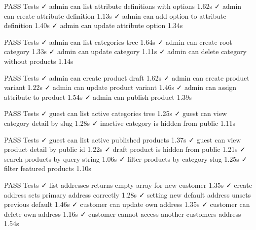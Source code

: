    PASS  Tests\Feature\CatalogAdminAttributeTest
  ✓ admin can list attribute definitions with options                    1.62s  
  ✓ admin can create attribute definition                                1.13s  
  ✓ admin can add option to attribute definition                         1.40s  
  ✓ admin can update attribute option                                    1.34s  

   PASS  Tests\Feature\CatalogAdminCategoryTest
  ✓ admin can list categories tree                                       1.64s  
  ✓ admin can create root category                                       1.33s  
  ✓ admin can update category                                            1.11s  
  ✓ admin can delete category without products                           1.14s  

   PASS  Tests\Feature\CatalogAdminProductTest
  ✓ admin can create product draft                                       1.62s  
  ✓ admin can create product variant                                     1.22s  
  ✓ admin can update product variant                                     1.46s  
  ✓ admin can assign attribute to product                                1.54s  
  ✓ admin can publish product                                            1.39s  

   PASS  Tests\Feature\CatalogPublicCategoryTest
  ✓ guest can list active categories tree                                1.25s  
  ✓ guest can view category detail by slug                               1.28s  
  ✓ inactive category is hidden from public                              1.11s  

   PASS  Tests\Feature\CatalogPublicProductTest
  ✓ guest can list active published products                             1.37s  
  ✓ guest can view product detail by public id                           1.22s  
  ✓ draft product is hidden from public                                  1.21s  
  ✓ search products by query string                                      1.06s  
  ✓ filter products by category slug                                     1.25s  
  ✓ filter featured products                                             1.10s  

   PASS  Tests\Feature\CustomerAddressTest
  ✓ list addresses returns empty array for new customer                  1.35s  
  ✓ create address sets primary address correctly                        1.28s  
  ✓ setting new default address unsets previous default                  1.46s  
  ✓ customer can update own address                                      1.35s  
  ✓ customer can delete own address                                      1.16s  
  ✓ customer cannot access another customers address                     1.54s  

